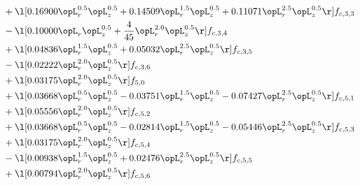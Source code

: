 \begin{alignat}{2}
& + \l[  0.16900 \opL_r^{0.5} \opL_z^{0.5} +  0.14509 \opL_r^{1.5} \opL_z^{0.5} +  0.11071 \opL_r^{2.5} \opL_z^{0.5}  \r] f_{c,3,3} \nonumber \\ 
& - \l[  0.10000 \opL_r \opL_z^{0.5} + \frac{4}{45} \opL_r^{2.0} \opL_z^{0.5}  \r] f_{c,3,4} \nonumber \\ 
& + \l[  0.04836 \opL_r^{1.5} \opL_z^{0.5} +  0.05032 \opL_r^{2.5} \opL_z^{0.5}  \r] f_{c,3,5} \nonumber \\ 
& - \l[  0.02222 \opL_r^{2.0} \opL_z^{0.5}  \r] f_{c,3,6} \nonumber \\ 
& + \l[  0.03175 \opL_r^{2.0} \opL_z^{0.5}  \r] f_{5,0} \nonumber \\ 
& + \l[  0.03668 \opL_r^{0.5} \opL_z^{0.5}   -0.03751 \opL_r^{1.5} \opL_z^{0.5}   -0.07427 \opL_r^{2.5} \opL_z^{0.5}  \r] f_{c,5,1} \nonumber \\ 
& + \l[  0.05556 \opL_r^{2.0} \opL_z^{0.5}  \r] f_{c,5,2} \nonumber \\ 
& + \l[  0.03668 \opL_r^{0.5} \opL_z^{0.5}   -0.02814 \opL_r^{1.5} \opL_z^{0.5}   -0.05446 \opL_r^{2.5} \opL_z^{0.5}  \r] f_{c,5,3} \nonumber \\ 
& + \l[  0.03175 \opL_r^{2.0} \opL_z^{0.5}  \r] f_{c,5,4} \nonumber \\ 
& - \l[  0.00938 \opL_r^{1.5} \opL_z^{0.5} +  0.02476 \opL_r^{2.5} \opL_z^{0.5}  \r] f_{c,5,5} \nonumber \\ 
& + \l[  0.00794 \opL_r^{2.0} \opL_z^{0.5}  \r] f_{c,5,6} \nonumber \\ 
\end{alignat} 


